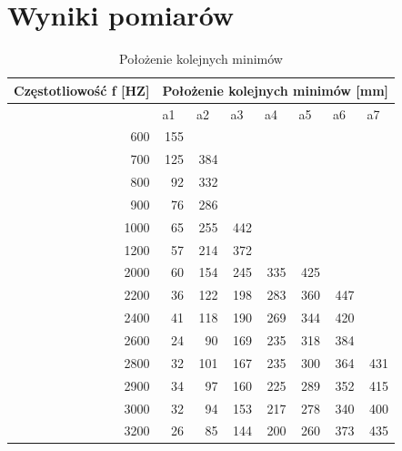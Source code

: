 \documentclass{article}
\begin{document}
\section{Wyniki pomiarów}

\begin{table}[htbp]
\centering
\begin{tabular}{|r|r|r|r|r|r|l|l|}
\hline
\multicolumn{1}{|c|}{Częstotliowość f [HZ]} & \multicolumn{ 7}{c|}{Położenie kolejnych minimów [mm]} \\ \hline
\multicolumn{1}{|l|}{} & \multicolumn{1}{l|}{a1} & \multicolumn{1}{l|}{a2} & \multicolumn{1}{l|}{a3} & \multicolumn{1}{l|}{a4} & \multicolumn{1}{l|}{a5} & a6 & a7 \\ \hline
600 & 155 & \multicolumn{1}{l|}{} & \multicolumn{1}{l|}{} & \multicolumn{1}{l|}{} & \multicolumn{1}{l|}{} &  &  \\ \hline
700 & 125 & 384 & \multicolumn{1}{l|}{} & \multicolumn{1}{l|}{} & \multicolumn{1}{l|}{} &  &  \\ \hline
800 & 92 & 332 & \multicolumn{1}{l|}{} & \multicolumn{1}{l|}{} & \multicolumn{1}{l|}{} &  &  \\ \hline
900 & 76 & 286 & \multicolumn{1}{l|}{} & \multicolumn{1}{l|}{} & \multicolumn{1}{l|}{} &  &  \\ \hline
1000 & 65 & 255 & 442 & \multicolumn{1}{l|}{} & \multicolumn{1}{l|}{} &  &  \\ \hline
1200 & 57 & 214 & 372 & \multicolumn{1}{l|}{} & \multicolumn{1}{l|}{} &  &  \\ \hline
2000 & 60 & 154 & 245 & 335 & 425 &  &  \\ \hline
2200 & 36 & 122 & 198 & 283 & 360 & \multicolumn{1}{r|}{447} &  \\ \hline
2400 & 41 & 118 & 190 & 269 & 344 & \multicolumn{1}{r|}{420} &  \\ \hline
2600 & 24 & 90 & 169 & 235 & 318 & \multicolumn{1}{r|}{384} &  \\ \hline
2800 & 32 & 101 & 167 & 235 & 300 & \multicolumn{1}{r|}{364} & \multicolumn{1}{r|}{431} \\ \hline
2900 & 34 & 97 & 160 & 225 & 289 & \multicolumn{1}{r|}{352} & \multicolumn{1}{r|}{415} \\ \hline
3000 & 32 & 94 & 153 & 217 & 278 & \multicolumn{1}{r|}{340} & \multicolumn{1}{r|}{400} \\ \hline
3200 & 26 & 85 & 144 & 200 & 260 & \multicolumn{1}{r|}{373} & \multicolumn{1}{r|}{435} \\ \hline
\end{tabular}
\label{}
\caption{Położenie kolejnych minimów}
\end{table}
\end{document}
